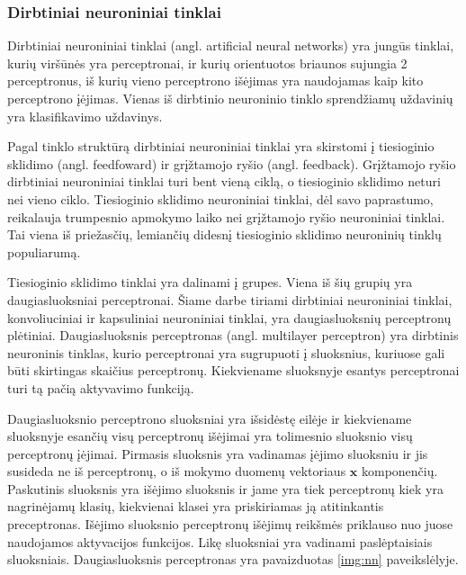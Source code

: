 \subsubsection{Dirbtiniai neuroniniai tinklai}

Dirbtiniai neuroniniai tinklai (angl. artificial neural networks) yra jungūs tinklai, kurių viršūnės yra perceptronai, ir kurių orientuotos briaunos sujungia 2 perceptronus, iš kurių vieno perceptrono išėjimas yra naudojamas kaip kito perceptrono įėjimas. Vienas iš dirbtinio neuroninio tinklo sprendžiamų uždavinių yra klasifikavimo uždavinys.

Pagal tinklo struktūrą dirbtiniai neuroniniai tinklai yra skirstomi į tiesioginio sklidimo (angl. feedfoward) ir grįžtamojo ryšio (angl. feedback). Grįžtamojo ryšio dirbtiniai neuroniniai tinklai turi bent vieną ciklą, o tiesioginio sklidimo neturi nei vieno ciklo. Tiesioginio sklidimo neuroniniai tinklai, dėl savo paprastumo, reikalauja trumpesnio apmokymo laiko nei grįžtamojo ryšio neuroniniai tinklai. Tai viena iš priežasčių, lemiančių didesnį tiesioginio sklidimo neuroninių tinklų populiarumą.

Tiesioginio sklidimo tinklai yra dalinami į grupes. Viena iš šių grupių yra daugiasluoksniai perceptronai. Šiame darbe tiriami dirbtiniai neuroniniai tinklai, konvoliuciniai ir kapsuliniai neuroniniai tinklai, yra daugiasluoksnių perceptronų plėtiniai. Daugiasluoksnis perceptronas (angl. multilayer perceptron) yra dirbtinis neuroninis tinklas, kurio perceptronai yra sugrupuoti į sluoksnius, kuriuose gali būti skirtingas skaičius perceptronų. Kiekviename sluoksnyje esantys perceptronai turi tą pačią aktyvavimo funkciją.

Daugiasluoksnio perceptrono sluoksniai yra išsidėstę eilėje ir kiekviename sluoksnyje esančių visų perceptronų išėjimai yra tolimesnio sluoksnio visų perceptronų įėjimai. Pirmasis sluoksnis  yra vadinamas įėjimo sluoksniu ir jis susideda ne iš perceptronų, o iš mokymo duomenų vektoriaus $\boldsymbol{x}$ komponenčių. Paskutinis sluoksnis yra išėjimo sluoksnis ir jame yra tiek perceptronų kiek yra nagrinėjamų klasių, kiekvienai klasei yra priskiriamas ją atitinkantis preceptronas. Išėjimo sluoksnio perceptronų išėjimų reikšmės priklauso nuo juose naudojamos aktyvacijos funkcijos. Likę sluoksniai yra vadinami paslėptaisiais sluoksniais. Daugiasluoksnis perceptronas yra pavaizduotas \ref{img:nn} paveikslėlyje.

